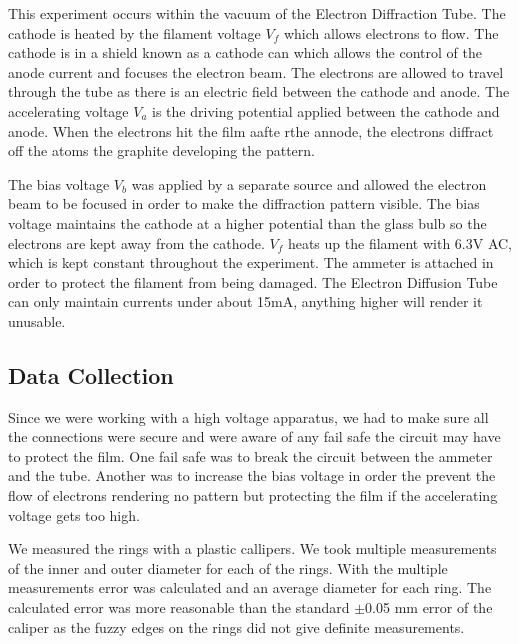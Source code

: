 \documentclass[11pt,letterpaper,onecolumn]{article}
\begin{document}
This experiment occurs within the vacuum of the Electron Diffraction Tube. The cathode is heated by the filament voltage $V_f$ which allows electrons to flow. The cathode is in a shield known as a cathode can which allows the control of the anode current and focuses the electron beam. The electrons are allowed to travel through the tube as there is an electric field between the cathode and anode. The accelerating voltage $V_a$ is the driving potential applied between the cathode and anode. When the electrons hit the film aafte rthe annode, the electrons diffract off the atoms the graphite developing the pattern.

The bias voltage $V_b$ was applied by a separate source and allowed the electron beam to be focused in order to make the diffraction pattern visible. The bias voltage maintains the cathode at a higher potential than the glass bulb so the electrons are kept away from the cathode. $V_f$ heats up the filament with 6.3V AC, which is kept constant throughout the experiment. The ammeter is attached in order to protect the filament from being damaged. The Electron Diffusion Tube can only maintain currents under about 15mA, anything higher will render it unusable.~\cite{ML}







\subsection{Data Collection}

Since we were working with a high voltage apparatus, we had to make sure all the connections were secure and were aware of any fail safe the circuit may have to protect the film. One fail safe was to break the circuit between the ammeter and the tube. Another was to increase the bias voltage in order the prevent the flow of electrons rendering no pattern but protecting the film if the accelerating voltage gets too high.

We measured the rings with a plastic callipers. We took multiple measurements of the inner and outer diameter for each of the rings. With the multiple measurements error was calculated and an average diameter for each ring. The calculated error was more reasonable than the standard $\pm$0.05 mm error of the caliper as the fuzzy edges on the rings did not give definite measurements.
\end{document}
